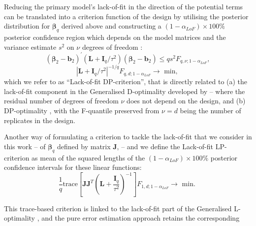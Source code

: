 Reducing the primary model's lack-of-fit in the direction of the potential terms can be translated into a criterion function of the design by utilising the posterior distribution for $\bm{\beta}_q$ derived above and constructing a $(1-\alpha_{LoF})\times100\%$ posterior confidence region which depends on the model matrices and the variance estimate $s^2$ on $\nu$ degrees of freedom \citep{Draper1998}:
\begin{equation*}
(\bm{\beta}_{2}-\bm{b}_{2})^{'}(\bm{L}+\bm{I}_{q}/\tau^{2})(\bm{\beta}_{2}-\bm{b}_{2})\leq qs^{2}F_{q,\nu;1-\alpha_{LoF}},
\end{equation*}
\begin{equation}
\label{eq::LoFDP_criterion}
\left|\bm{L}+\bm{I}_{q}/\tau^{2}\right|^{-1/q}F_{q,d;1-\alpha_{LoF}} \longrightarrow \mbox{ min, }  
\end{equation}  
which we refer to as ``Lack-of-fit DP-criterion'', that is directly related to (a) the lack-of-fit component in the Generalised D-optimality developed by \cite{Goos2005model} -- where the residual number of degrees of freedom $\nu$ does not depend on the design, and (b) DP-optimality \citep{GilmourTrinca2012}, with the F-quantile preserved from $\nu = d$ being the number of replicates in the design. 

Another way of formulating a criterion to tackle the lack-of-fit that we consider in this work --  of $\bm{\beta}_q$ defined by matrix $\bm{J}$, -- and we define the Lack-of-fit LP-criterion as mean of the squared lengths of the $(1-\alpha_{LoF})\times100\%$ posterior confidence intervals for these linear functions:
\begin{equation}
\label{eq::LoFLP_criterion}
\frac{1}{q}\mbox{trace}\left[\bm{JJ}^T\left(\bm{L}+\frac{\bm{I}_{q}}{\tau^{2}}\right)^{-1}\right]F_{1,d;1-\alpha_{LoF}}  \longrightarrow \mbox{ min. } 
\end{equation} 

This trace-based criterion is linked to the lack-of-fit part of the Generalised L-optimality \citep{Goos2005model}, and the pure error estimation approach retains the corresponding 

